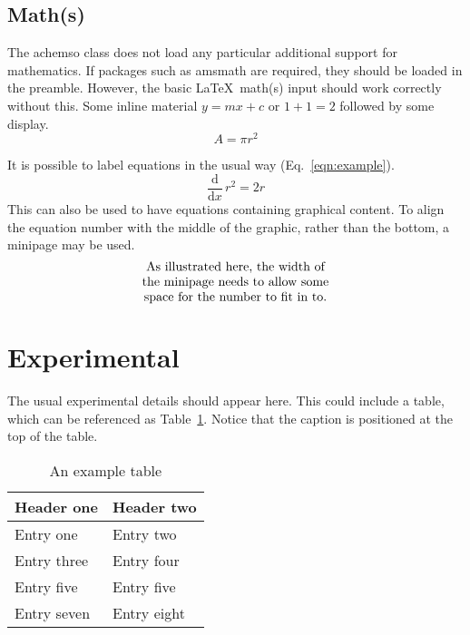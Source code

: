 \documentclass[journal=jacsat,manuscript=article]{achemso}
\begin{document}
\subsection{Math(s)}

The \textsf{achemso} class does not load any particular additional
support for mathematics.  If packages such as \textsf{amsmath} are
required, they should be loaded in the preamble.  However,
the basic \LaTeX\ math(s) input should work correctly without
this.  Some inline material \( y = mx + c \) or $ 1 + 1 = 2 $
followed by some display. \[ A = \pi r^2 \]

It is possible to label equations in the usual way (Eq.~\ref{eqn:example}).
\begin{equation}
  \frac{\mathrm{d}}{\mathrm{d}x} \, r^2 = 2r \label{eqn:example}
\end{equation}
This can also be used to have equations containing graphical
content. To align the equation number with the middle of the graphic,
rather than the bottom, a minipage may be used.
\begin{equation}
  \begin{minipage}[c]{0.80\linewidth}
    \centering
    As illustrated here, the width of \\
    the minipage needs to allow some  \\
    space for the number to fit in to.
  \end{minipage}
  \label{eqn:graphic}
\end{equation}

\section{Experimental}

The usual experimental details should appear here.  This could
include a table, which can be referenced as Table~\ref{tbl:example}.
Notice that the caption is positioned at the top of the table.
\begin{table}
  \caption{An example table}
  \label{tbl:example}
  \begin{tabular}{ll}
    \hline
    Header one  & Header two  \\
    \hline
    Entry one   & Entry two   \\
    Entry three & Entry four  \\
    Entry five  & Entry five  \\
    Entry seven & Entry eight \\
    \hline
  \end{tabular}
\end{table}
\end{document}
